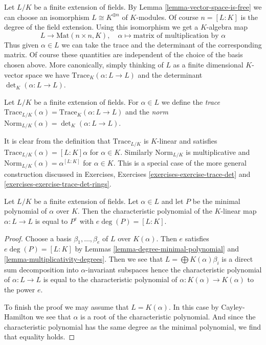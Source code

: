 \noindent
Let $L/K$ be a finite extension of fields. By
Lemma \ref{lemma-vector-space-is-free}
we can choose an isomorphism $L \cong K^{\oplus n}$ of $K$-modules.
Of course $n = [L : K]$ is the degree of the field extension.
Using this isomorphism we get a $K$-algebra map
$$
L \longrightarrow \text{Mat}(n \times n, K),\quad
\alpha \longmapsto \text{matrix of multiplication by }\alpha
$$
Thus given $\alpha \in L$ we can take the trace and the determinant
of the corresponding matrix. Of course these quantities are independent
of the choice of the basis chosen above. More canonically, simply thinking
of $L$ as a finite dimensional $K$-vector space we have
$\text{Trace}_K(\alpha : L \to L)$ and the determinant
$\det_K(\alpha : L \to L)$.

\begin{definition}
\label{definition-trace-norm}
Let $L/K$ be a finite extension of fields. For $\alpha \in L$ we define
the {\it trace}
$\text{Trace}_{L/K}(\alpha) = \text{Trace}_K(\alpha : L \to L)$
and the {\it norm}
$\text{Norm}_{L/K}(\alpha) = \det_K(\alpha : L \to L)$.
\end{definition}

\noindent
It is clear from the definition that
$\text{Trace}_{L/K}$ is $K$-linear and satisfies
$\text{Trace}_{L/K}(\alpha) = [L : K]\alpha$ for $\alpha \in K$.
Similarly $\text{Norm}_{L/K}$ is multiplicative and
$\text{Norm}_{L/K}(\alpha) = \alpha^{[L : K]}$ for $\alpha \in K$.
This is a special case of the more general construction discussed
in Exercises, Exercises \ref{exercises-exercise-trace-det} and
\ref{exercises-exercise-trace-det-rings}.

\begin{lemma}
\label{lemma-characteristic-vs-minimal-polynomial}
Let $L/K$ be a finite extension of fields. Let $\alpha \in L$ and let $P$
be the minimal polynomial of $\alpha$ over $K$. Then the characteristic
polynomial of the $K$-linear map $\alpha : L \to L$ is equal to
$P^e$ with $e \deg(P) = [L : K]$.
\end{lemma}

\begin{proof}
Choose a basis $\beta_1, \ldots, \beta_e$ of $L$ over $K(\alpha)$.
Then $e$ satisfies $e \deg(P) = [L : K]$ by
Lemmas \ref{lemma-degree-minimal-polynomial} and
\ref{lemma-multiplicativity-degrees}.
Then we see that $L = \bigoplus K(\alpha) \beta_i$ is a
direct sum decomposition into $\alpha$-invariant subspaces
hence the characteristic polynomial of $\alpha : L \to L$
is equal to the characteristic polynomial of
$\alpha : K(\alpha) \to K(\alpha)$ to the power $e$.

\medskip\noindent
To finish the proof we may assume that $L = K(\alpha)$.
In this case by Cayley-Hamilton we see that $\alpha$
is a root of the characteristic polynomial. And since the
characteristic polynomial has the same degree as the minimal
polynomial, we find that equality holds.
\end{proof}

